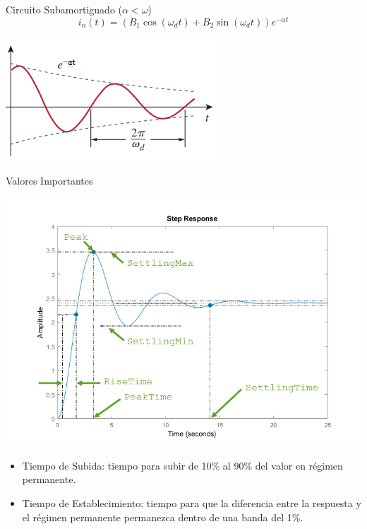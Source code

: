 \documentclass[xcolor={usenames,svgnames,dvipsnames}]{beamer}
\begin{document}
\begin{frame}[label={sec:orgba11872}]{Circuito Subamortiguado (\(\alpha < \omega\))}
\[
  \boxed{i_n(t) = (B_1\cos(\omega_d t) + B_2\sin(\omega_d t)) e^{-\alpha t}}
\]

\begin{center}
\includegraphics[width=.9\linewidth]{figs/Subamortiguado_AS.pdf}
\end{center}
\end{frame}

\begin{frame}[label={sec:org0f9899c}]{Valores Importantes}
\begin{center}
\includegraphics[height=0.6\textheight]{figs/RespuestaEscalon_SegundoOrden.png}
\end{center}

\begin{itemize}
\item \alert{Tiempo de Subida}: tiempo para subir de 10\% al 90\% del valor en régimen permanente.

\item \alert{Tiempo de Establecimiento}: tiempo para que la diferencia entre la respuesta y el régimen permanente permanezca dentro de una banda del 1\%.
\end{itemize}
\end{frame}
\end{document}
